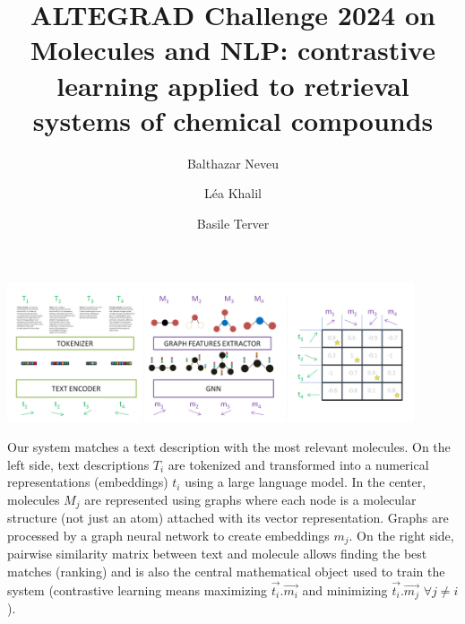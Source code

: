 \documentclass[sigconf, nonacm]{acmart}
\title{ALTEGRAD Challenge 2024 on Molecules and NLP: contrastive learning applied to retrieval systems of chemical compounds}
\author{Balthazar Neveu}
\affiliation{%
  \institution{ENS Paris-Saclay}
  \city{Saclay}
  \country{France}
}
\author{Léa Khalil}
\affiliation{%
  \institution{Ecole Polytechnique}
  \city{Palaiseau}
  \country{France}
}
\author{Basile Terver}
\affiliation{%
  \institution{Ecole Polytechnique}
  \city{Palaiseau}
  \country{France}
}
\begin{document}

  \begin{teaserfigure}
    \includegraphics[width=0.9\textwidth]{figures/mol_text_overview.PNG}
    \centering
    \caption{Our system matches a text description with the most relevant molecules. On the left side, text descriptions $T_{i}$ are tokenized and transformed into a numerical representations (embeddings) $t_{i}$ using a large language model. In the center, molecules $M_{j}$ are represented using graphs where each node is a molecular structure (not just an atom) attached with its vector representation. Graphs are processed by a graph neural network to create embeddings $m_{j}$. On the right side, pairwise similarity matrix between text and molecule allows finding the best matches (ranking) and is also the central mathematical object used to train the system (contrastive learning means maximizing $\vec{t_{i}}.\vec{m_{i}}$ and minimizing $\vec{t_{i}}.\vec{m_{j}}$  $\forall j \neq i$).
    }
    \label{fig:original_pipeline}
\end{teaserfigure}

\maketitle



  
  
  
  
  

  \newpage
  
  
  \newpage
  \appendix
  
  
  
  
  \newpage
\end{document}
